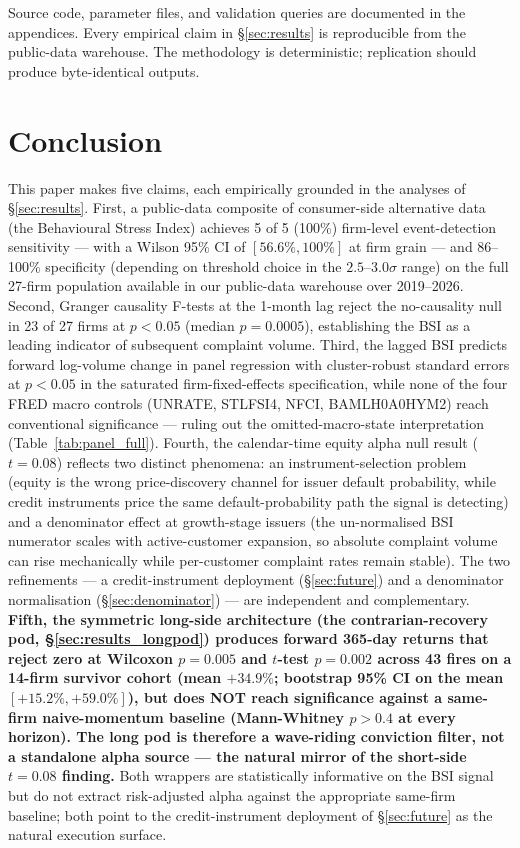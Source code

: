 \documentclass[11pt,a4paper]{article}
\begin{document}
Source code, parameter files, and validation queries are documented in the appendices. Every empirical claim in §\ref{sec:results} is reproducible from the public-data warehouse. The methodology is deterministic; replication should produce byte-identical outputs.

\section{Conclusion}\label{sec:conclusion}

This paper makes five claims, each empirically grounded in the analyses of §\ref{sec:results}. First, a public-data composite of consumer-side alternative data (the Behavioural Stress Index) achieves 5 of 5 (100\%) firm-level event-detection sensitivity --- with a Wilson 95\% CI of $[56.6\%, 100\%]$ at firm grain --- and 86--100\% specificity (depending on threshold choice in the $2.5$--$3.0\sigma$ range) on the full 27-firm population available in our public-data warehouse over 2019--2026. Second, Granger causality F-tests at the 1-month lag reject the no-causality null in 23 of 27 firms at $p<0.05$ (median $p = 0.0005$), establishing the BSI as a leading indicator of subsequent complaint volume. Third, the lagged BSI predicts forward log-volume change in panel regression with cluster-robust standard errors at $p<0.05$ in the saturated firm-fixed-effects specification, while none of the four FRED macro controls (UNRATE, STLFSI4, NFCI, BAMLH0A0HYM2) reach conventional significance --- ruling out the omitted-macro-state interpretation (Table~\ref{tab:panel_full}). Fourth, the calendar-time equity alpha null result ($t=0.08$) reflects two distinct phenomena: an instrument-selection problem (equity is the wrong price-discovery channel for issuer default probability, while credit instruments price the same default-probability path the signal is detecting) and a denominator effect at growth-stage issuers (the un-normalised BSI numerator scales with active-customer expansion, so absolute complaint volume can rise mechanically while per-customer complaint rates remain stable). The two refinements --- a credit-instrument deployment (§\ref{sec:future}) and a denominator normalisation (§\ref{sec:denominator}) --- are independent and complementary. \textbf{Fifth, the symmetric long-side architecture (the contrarian-recovery pod, §\ref{sec:results_longpod}) produces forward 365-day returns that reject zero at Wilcoxon $p = 0.005$ and $t$-test $p = 0.002$ across 43 fires on a 14-firm survivor cohort (mean $+34.9\%$; bootstrap 95\% CI on the mean $[+15.2\%, +59.0\%]$), but does NOT reach significance against a same-firm naive-momentum baseline (Mann-Whitney $p > 0.4$ at every horizon). The long pod is therefore a wave-riding conviction filter, not a standalone alpha source --- the natural mirror of the short-side $t = 0.08$ finding.} Both wrappers are statistically informative on the BSI signal but do not extract risk-adjusted alpha against the appropriate same-firm baseline; both point to the credit-instrument deployment of §\ref{sec:future} as the natural execution surface.
\end{document}
